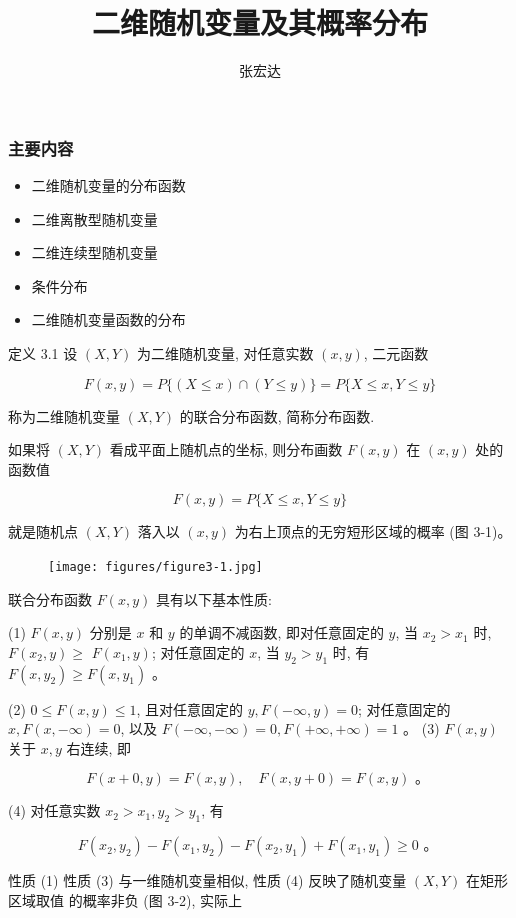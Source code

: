 \documentclass{beamer}
\title[]{二维随机变量及其概率分布}
\author[概率统计]{张宏达}
\institute{Nanjing University}
\date{}
\begin{document}
	\begin{frame}
		\titlepage
	\end{frame}
	
	\begin{frame}
		\frametitle{主要内容}
		\begin{itemize}
			\item 二维随机变量的分布函数
			\item 二维离散型随机变量
			\item 二维连续型随机变量
			\item 条件分布
			\item 二维随机变量函数的分布
		\end{itemize}
	\end{frame}
	
	\begin{frame}
		定义 3.1 设 $(X, Y)$ 为二维随机变量, 对任意实数 $(x, y)$, 二元函数
		
		$$
		F(x, y)=P\{(X \leqslant x) \cap(Y \leqslant y)\}=P\{X \leqslant x, Y \leqslant y\}
		$$
		
		称为二维随机变量 $(X, Y)$ 的联合分布函数, 简称分布函数.
	\end{frame}
	
	\begin{frame}
		如果将 $(X, Y)$ 看成平面上随机点的坐标, 则分布画数 $F(x, y)$ 在 $(x, y)$ 处的函数值
		
		$$
		F(x, y)=P\{X \leqslant x, Y \leqslant y\}
		$$
		
		就是随机点 $(X, Y)$ 落入以 $(x, y)$ 为右上顶点的无穷短形区域的概率 (图 3-1)。
		\begin{figure}
			\centering
			\texttt{[image: figures/figure3-1.jpg]}
		\end{figure}
	\end{frame}
	
	\begin{frame}
		联合分布函数 $F(x, y)$ 具有以下基本性质:
		
		(1) $F(x, y)$ 分别是 $x$ 和 $y$ 的单调不减函数, 即对任意固定的 $y$, 当 $x_{2}>x_{1}$ 时, $F\left(x_{2}, y\right) \geqslant$ $F\left(x_{1}, y\right)$; 对任意固定的 $x$, 当 $y_{2}>y_{1}$ 时, 有 $F\left(x, y_{2}\right) \geqslant F\left(x, y_{1}\right)$ 。
		
		(2) $0 \leqslant F(x, y) \leqslant 1$, 且对任意固定的 $y, F(-\infty, y)=0$; 对任意固定的 $x, F(x,-\infty)=0$, 以及 $F(-\infty,-\infty)=0, F(+\infty,+\infty)=1$ 。 (3) $F(x, y)$ 关于 $x, y$ 右连续, 即
		
		$$
		F(x+0, y)=F(x, y), \quad F(x, y+0)=F(x, y) \text { 。 }
		$$
		
		(4) 对任意实数 $x_{2}>x_{1}, y_{2}>y_{1}$, 有
		
		$$
		F\left(x_{2}, y_{2}\right)-F\left(x_{1}, y_{2}\right)-F\left(x_{2}, y_{1}\right)+F\left(x_{1}, y_{1}\right) \geqslant 0 \text { 。 }
		$$
		
		性质 (1) 性质 (3) 与一维随机变量相似, 性质 (4) 反映了随机变量 $(X, Y)$ 在矩形区域取值 的概率非负 (图 3-2), 实际上
	\end{frame}
	
\end{document}
